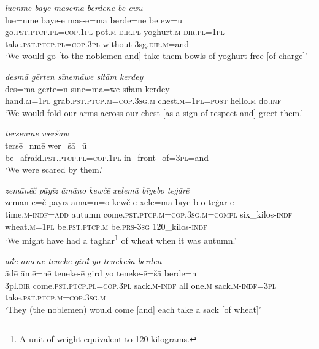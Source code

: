\ea \label{RE.67}
\textit{lūēnmē bāyē māsēmā berdēnē bē ewū} \\ 
\gll lūē=nmē bāye-ē mās-ē=mā berdē=nē bē ew=ū \\ 
 go\textsc{.pst}\textsc{.ptcp}\textsc{.pl}\textsc{=cop}\textsc{.\textsc{1pl}} pot\textsc{.m}\textsc{-dir}\textsc{.pl} yoghurt\textsc{.m}\textsc{-dir}\textsc{.pl}\textsc{=\textsc{1pl}} take\textsc{.pst}\textsc{.ptcp}\textsc{.pl}\textsc{=cop}\textsc{.3pl} without 3sg\textsc{.dir}\textsc{.m}=and \\ 
\glt `We would go [to the noblemen and] take them bowls of yoghurt free [of charge]'
\z 
 
\ea \label{RE.68}
\textit{desmā gērten sīnemāwe siɫām kerdey} \\ 
\gll des=mā gērte=n sīne=mā=we siɫām kerdey \\ 
 hand\textsc{.m}\textsc{=\textsc{1pl}} grab\textsc{.pst}\textsc{.ptcp}\textsc{.m}\textsc{=cop}\textsc{.3sg}\textsc{.m} chest\textsc{.m}\textsc{=\textsc{1pl}}\textsc{=\textsc{post}} hello\textsc{.m} do\textsc{.inf} \\ 
\glt `We would fold our arms across our chest [as a sign of respect and] greet them.'
\z 
 
\ea \label{RE.69}
\textit{tersēnmē weršāw} \\ 
\gll tersē=nmē wer=šā=ū \\ 
 be\_afraid\textsc{.pst}\textsc{.ptcp}\textsc{.pl}\textsc{=cop}\textsc{.\textsc{1pl}} in\_front\_of\textsc{=3pl}=and \\ 
\glt `We were scared by them.'
\z 
 
\ea \label{RE.70}
\textit{zemānēč pāyīz āmāno kewčē xelemā bīyebo teġārē} \\ 
\gll zemān-ē=č pāyīz āmā=n=o kewč-ē xele=mā bīye b-o teġār-ē \\ 
 time\textsc{.m}\textsc{-indf}\textsc{=add} autumn come\textsc{.pst}\textsc{.ptcp}\textsc{.m}\textsc{=cop}\textsc{.3sg}\textsc{.m}\textsc{=compl} six\_kilos\textsc{-indf} wheat\textsc{.m}\textsc{=\textsc{1pl}} be\textsc{.pst}\textsc{.ptcp}\textsc{.m} be\textsc{.prs}\textsc{-3sg} 120\_kilos\textsc{-indf} \\ 
\glt `We might have had a taghar\footnote{A unit of weight equivalent to 120 kilograms.} of wheat when it was autumn.'
\z 
 
\ea \label{RE.71}
\textit{āđē āmēnē tenekē girđ yo tenekēšā berden} \\ 
\gll āđē āmē=nē teneke-ē girđ yo teneke-ē=šā berde=n \\ 
 3pl\textsc{.dir} come\textsc{.pst}\textsc{.ptcp}\textsc{.pl}\textsc{=cop}\textsc{.3pl} sack\textsc{.m}\textsc{-indf} all one\textsc{.m} sack\textsc{.m}\textsc{-indf}\textsc{=3pl} take\textsc{.pst}\textsc{.ptcp}\textsc{.m}\textsc{=cop}\textsc{.3sg}\textsc{.m} \\ 
\glt `They (the noblemen) would come [and] each take a sack [of wheat]'
\z 
 
